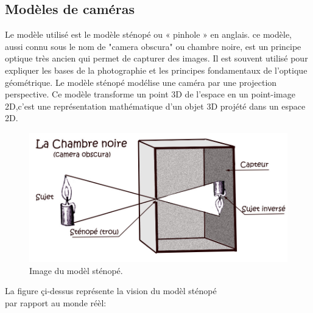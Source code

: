 \subsection{Modèles de caméras}
Le modèle utilisé est le modèle sténopé ou « pinhole » en anglais.
ce modèle, aussi connu sous le nom de "camera obscura" ou chambre noire, est un principe optique très ancien qui permet de capturer des images. Il est souvent utilisé pour expliquer les bases de la photographie et les principes fondamentaux de l'optique géométrique. \cite{orteu_calibrage_nodate}
Le modèle sténopé modélise une caméra par une projection perspective. Ce modèle transforme un point 3D de l'espace  en un point-image 2D,c'est une représentation mathématique d'un objet 3D projété dans un espace 2D.\\
 \vspace{-0.3 cm}
 \begin{figure}[h]
 	\centering
 	\includegraphics[scale=0.35]{image/chambre-noire.jpg}
 	\decoRule
 	\caption[Modèl sténopé]{Image du modèl sténopé.}
 	\label{fig:Modèl sténopé}
 \end{figure}
  
La figure çi-dessus représente la vision du modèl sténopé \\
par rapport au monde réèl:\\

